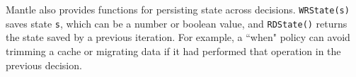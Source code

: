 Mantle also provides functions for persisting state across decisions.
\texttt{WRState(s)} saves state \texttt{s}, which can be a number or boolean
value, and \texttt{RDState()} returns the state saved by a previous iteration.
For example, a ``when" policy can avoid trimming a cache or migrating data if
it had performed that operation in the previous decision.



